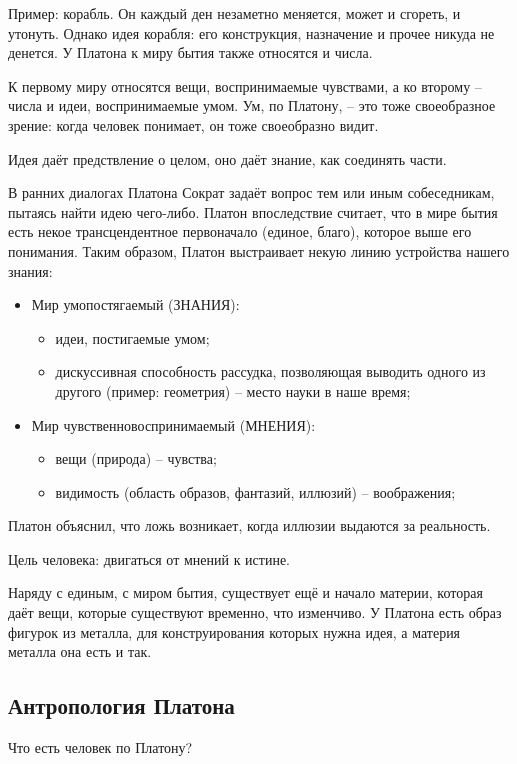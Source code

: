 \documentclass[a4paper, 12pt]{book} %
\begin{document}
Пример: корабль. Он каждый ден незаметно меняется, может и сгореть, и утонуть. Однако идея корабля: его конструкция, назначение и прочее никуда не денется.    
У Платона к миру бытия также относятся и числа.

К первому миру относятся вещи, воспринимаемые чувствами, а ко второму -- числа и идеи, воспринимаемые умом. Ум, по Платону, -- это тоже своеобразное зрение: когда человек понимает, он тоже своеобразно видит. 

Идея даёт предствление о целом, оно даёт знание, как соединять части.

В ранних диалогах Платона Сократ задаёт вопрос тем или иным собеседникам, пытаясь найти идею чего-либо. Платон впоследствие считает, что в мире бытия есть некое трансцендентное первоначало (единое, благо), которое выше его понимания. Таким образом, Платон выстраивает некую линию устройства нашего знания:

\begin{itemize}
\item Мир умопостягаемый (ЗНАНИЯ):
\begin{itemize}
\item идеи, постигаемые умом;
\item дискуссивная способность рассудка, позволяющая выводить одного из другого (пример: геометрия) -- место науки в наше время;
\end{itemize}
\item Мир чувственновоспринимаемый (МНЕНИЯ):
\begin{itemize}
\item вещи (природа) -- чувства;
\item видимость (область образов, фантазий, иллюзий) -- воображения;
\end{itemize}
\end{itemize}

Платон объяснил, что ложь возникает, когда иллюзии выдаются за реальность.

Цель человека: двигаться от мнений к истине.

Наряду с единым, с миром бытия, существует ещё и начало материи, которая даёт вещи, которые существуют временно, что изменчиво. У Платона есть образ фигурок из металла, для конструирования которых нужна идея, а материя металла она есть и так.

\subsection{Антропология Платона}
Что есть человек по Платону?
\end{document}
